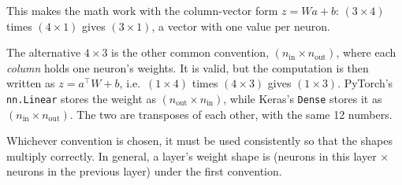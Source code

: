 This makes the math work with the column-vector form $z = Wa + b$: $(3 \times 4)$ times $(4 \times 1)$ gives $(3 \times 1)$, a vector with one value per neuron.

The alternative $4 \times 3$ is the other common convention, $(n_{\text{in}} \times n_{\text{out}})$, where each \emph{column} holds one neuron's weights. It is valid, but the computation is then written as $z = a^\top W + b$, i.e.\ $(1 \times 4)$ times $(4 \times 3)$ gives $(1 \times 3)$. PyTorch's \texttt{nn.Linear} stores the weight as $(n_{\text{out}} \times n_{\text{in}})$, while Keras's \texttt{Dense} stores it as $(n_{\text{in}} \times n_{\text{out}})$. The two are transposes of each other, with the same 12 numbers.

Whichever convention is chosen, it must be used consistently so that the shapes multiply correctly. In general, a layer's weight shape is (neurons in this layer $\times$ neurons in the previous layer) under the first convention.